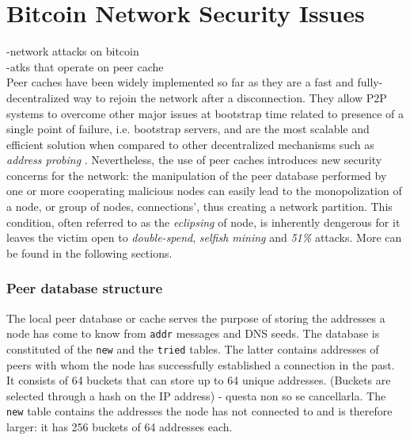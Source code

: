 \documentclass[12pt, letterpaper, twoside]{article}
\begin{document}
\section{Bitcoin Network Security Issues}
-network attacks on bitcoin\\
-atks that operate on peer cache\\
Peer caches have been widely implemented so far as they are a fast and fully-decentralized way to rejoin the network after a disconnection. They allow P2P systems to overcome other major issues at bootstrap time related to presence of a single point of failure, i.e. bootstrap servers, and are the most scalable and efficient solution when compared to other decentralized mechanisms such as \textit{address probing} \cite{decentrbootstrapp2p}.
Nevertheless, the use of peer caches introduces new security concerns for the network:
the manipulation of the peer database performed by one or more cooperating malicious nodes can easily lead to the monopolization of a node, or group of nodes, connections', thus creating a network partition. This condition, often referred to as the \textit{eclipsing} of node, is inherently dengerous for it leaves the victim open to \textit{double-spend}, \textit{selfish mining} and \textit{51\%} attacks. More can be found in the following sections.
\subsubsection{Peer database structure}\label{peercacheintro}
The local peer database or cache serves the purpose of storing the addresses a node has come to know from \texttt{addr} messages and DNS seeds. The database is constituted of the \texttt{new} and the \texttt{tried} tables. The latter contains addresses of peers with whom the node has successfully established a connection in the past. It consists of 64 buckets that can store up to 64 unique addresses. (Buckets are selected through a hash on the IP address) - questa non so se cancellarla. The \texttt{new} table contains the addresses the node has not connected to and is therefore larger: it has 256 buckets of 64 addresses each.\\
\end{document}
